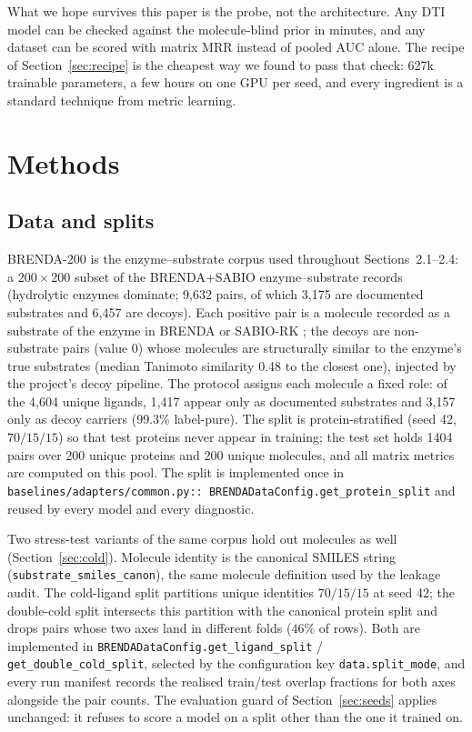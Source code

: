 \documentclass[11pt,a4paper]{article}
\newcommand{\mrr}{matrix MRR}
\begin{document}
What we hope survives this paper is the probe, not the architecture. Any
DTI model can be checked against the molecule-blind prior in minutes, and
any dataset can be scored with \mrr{} instead of pooled AUC alone. The
recipe of Section~\ref{sec:recipe} is the cheapest way we found to pass that check: 627k
trainable parameters, a few hours on one GPU per seed, and every ingredient
is a standard technique from metric learning.

\section{Methods}
\label{sec:methods}

\subsection{Data and splits}
\label{sec:data}

BRENDA-200 is the enzyme--substrate corpus used throughout
Sections~2.1--2.4: a $200\times200$ subset of the BRENDA+SABIO
enzyme--substrate records (hydrolytic enzymes dominate; 9{,}632 pairs, of
which 3{,}175 are documented substrates and 6{,}457 are decoys). Each
positive pair is a molecule recorded as a substrate of the enzyme in BRENDA
\citep{chang2021brenda} or SABIO-RK \citep{wittig2018sabiork}; the decoys
are non-substrate pairs (value 0) whose molecules are structurally similar
to the enzyme's true substrates (median Tanimoto similarity 0.48 to the
closest one), injected by the project's decoy pipeline. The protocol
assigns each molecule a fixed role: of the 4{,}604 unique ligands, 1{,}417
appear only as documented substrates and 3{,}157 only as decoy carriers
(99.3\% label-pure). The split is
protein-stratified (seed 42, $70/15/15$) so that test proteins never appear
in training; the test set holds 1404 pairs over 200 unique proteins and 200
unique molecules, and all matrix metrics are computed on this pool. The
split is implemented once in \texttt{baselines/adapters/common.py::
BRENDADataConfig.get\_protein\_split} and reused by every model and every
diagnostic.

Two stress-test variants of the same corpus hold out molecules as well
(Section~\ref{sec:cold}). Molecule identity is the canonical SMILES string
(\texttt{substrate\_smiles\_canon}), the same molecule definition used by
the leakage audit. The cold-ligand split partitions unique identities
$70/15/15$ at seed 42; the double-cold split intersects this partition with
the canonical protein split and drops pairs whose two axes land in different
folds ($46\%$ of rows). Both are implemented in
\texttt{BRENDADataConfig.get\_ligand\_split} /
\texttt{get\_double\_cold\_split}, selected by the configuration key
\texttt{data.split\_mode}, and every run manifest records the realised
train/test overlap fractions for both axes alongside the pair counts. The
evaluation guard of Section~\ref{sec:seeds} applies unchanged: it refuses to
score a model on a split other than the one it trained on.
\end{document}
